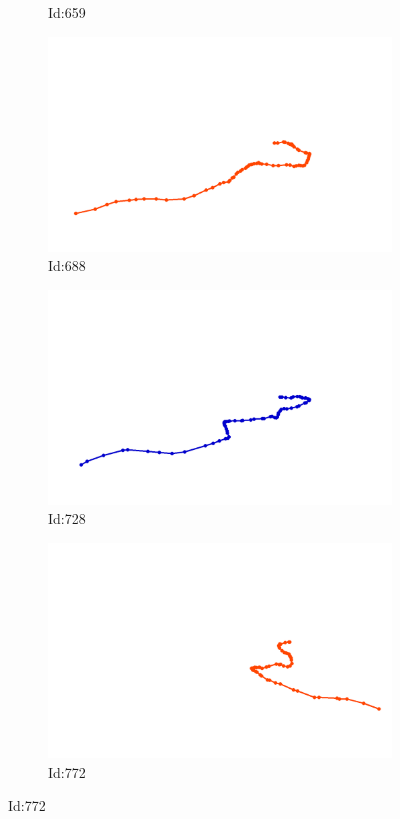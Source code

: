 \documentclass[12pt,twoside]{report}
\begin{document}
\begin{figure}
\begin{subfigure}[b]{0.20\textwidth}
\caption{Id:659}
\end{subfigure}
\begin{subfigure}[b]{0.20\textwidth}
\centering
\includegraphics[width=\textwidth]{../../trajectories/688.png}
\caption{Id:688}
\end{subfigure}
\begin{subfigure}[b]{0.20\textwidth}
\centering
\includegraphics[width=\textwidth]{../../trajectories/728.png}
\caption{Id:728}
\end{subfigure}
\begin{subfigure}[b]{0.20\textwidth}
\centering
\includegraphics[width=\textwidth]{../../trajectories/772.png}
\caption{Id:772}
\end{subfigure}
\end{figure}
\end{document}
